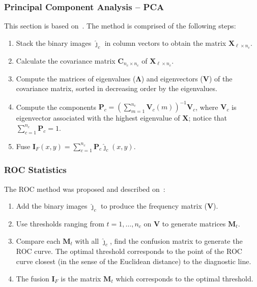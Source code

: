 \documentclass[journal]{IEEEtran}
\begin{document}
\subsubsection{Principal Component Analysis -- PCA}

This section is based on~\cite{n_r,mit}.
The method is comprised of the following steps:
\begin{enumerate}
\item Stack the binary images $\bm{\widehat\jmath}_c$ in column vectors to obtain the matrix $\bm X_{\ell\times n_c}$.
\item Calculate the covariance matrix $\bm C_{n_c\times n_c}$ of $\bm X_{\ell\times n_c}$.
\item Compute the matrices of eigenvalues ($\bm\Lambda$) and eigenvectors ($\bm V$) of the covariance matrix, sorted in decreasing order by the eigenvalues. %
\item Compute the components $\bm P_c=(\sum_{m=1}^{n_c} \bm V_c(m))^{-1}{\bm V_c}$, where $\bm V_c$ is eigenvector associated with the highest eigenvalue of $\bm X$; notice that $\sum_{c=1}^{n_c}\bm P_c=1$.
\item Fuse $\bm I_F(x,y)=\sum_{c=1}^{n_c}\bm P_c\bm{\widehat\jmath}_c(x,y)$.
\end{enumerate}

\subsubsection{ROC Statistics}
The ROC method was proposed and described on~\cite{gs,fawcett}:
\begin{enumerate}
\item Add the binary images $\bm{\widehat\jmath}_c$ to produce the frequency matrix ($\bm V$).
\item Use thresholds ranging from $t=1,\dots,n_c$ on $\bm V$ to generate matrices $\bm M_t$.
\item Compare each $\bm M_t$ with all $\bm{\widehat\jmath}_c$, find the confusion matrix to generate the ROC curve. 
The optimal threshold corresponds to the point of the ROC curve closest (in the sense of the Euclidean distance) to the diagnostic line.
\item The fusion $\bm I_F$ is the matrix $\bm M_t$ which corresponds to the optimal threshold.
\end{enumerate}
\end{document}
